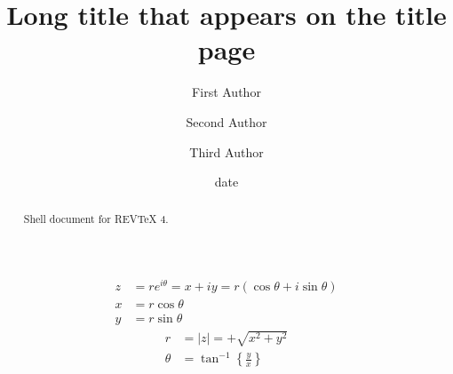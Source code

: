 \documentclass[aps,preprint]{revtex4}%
\begin{document}
\title[Short title for running header]{Long title that appears on the title page}
\author{First Author}
\author{Second Author}
\author{Third Author}

\begin{abstract}
Shell document for REV\TeX{} 4.

\end{abstract}
\date[Date text]{date}




\maketitle
\tableofcontents
%

\begin{align*}
z  &  =re^{i\theta}=x+iy=r\left(  \cos\theta+i\sin\theta\right) \\
x  &  =r\cos\theta\\
y  &  =r\sin\theta
\end{align*}%
\begin{align*}
r  &  =\left\vert z\right\vert =+\sqrt{x^{2}+y^{2}}\\
\theta &  =\tan^{-1}\left\{  \frac{y}{x}\right\}
\end{align*}
%
\end{document}
